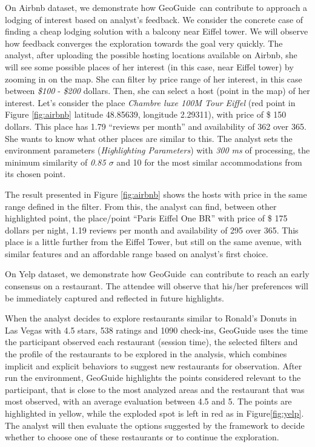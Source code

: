 \documentclass[conference,compsoc]{IEEEtran}
\newcommand{\framework}{{\sc GeoGuide}}
\begin{document}
\vspace{5pt}
 On Airbnb dataset, we demonstrate how \framework\ can contribute to approach a lodging of interest based on analyst's feedback. We consider the concrete case of finding a cheap lodging solution with a balcony near Eiffel tower. We will observe how feedback converges the exploration towards the goal very quickly. The analyst, after uploading the possible hosting locations available on Airbnb, she will see some possible places of her interest (in this case, near Eiffel tower) by zooming in on the map. She can filter by price range of her interest, in this case between \textit{\$100} - \textit{\$200} dollars. Then, she can select a host (point in the map) of her interest. Let's consider the place \textit{Chambre luxe 100M Tour Eiffel} (red point in Figure \ref{fig:airbnb} latitude 48.85639, longitude 2.29311), with price of \$ 150 dollars. This place has 1.79 ``reviews per month'' and availability of 362 over 365. She wants to know what other places are similar to this. The analyst sets the environment parameters (\textit{Highlighting Parameters}) with \textit{300 ms} of processing, the minimum similarity of \textit{0.85 $\sigma$} and 10 for the most similar accommodations from its chosen point.

The result presented in Figure \ref{fig:airbnb} shows the hosts with price in the same range defined in the filter. From this, the analyst can find, between other highlighted point, the place/point ``Paris Eiffel One BR''  with price of \$ 175 dollars per night, 1.19 reviews per month and availability of 295 over 365. This place is a little further from the Eiffel Tower, but still on the same avenue, with similar features and an affordable range based on analyst's first choice.



\vspace{5pt}
 On Yelp dataset, we demonstrate how \framework\ can contribute to reach an early consensus on a restaurant. The attendee will observe that his/her preferences will be immediately captured and reflected in future highlights. 

When the analyst decides to explore restaurants similar to Ronald's Donuts in Las Vegas with 4.5 stars, 538 ratings and 1090 check-ins, GeoGuide uses the time the participant observed each restaurant (session time), the selected filters and the profile of the restaurants to be explored in the analysis, which combines implicit and explicit behaviors to suggest new restaurants for observation. After run the environment, GeoGuide highlights the points considered relevant to the participant, that is close to the most analyzed areas and the restaurant that was most observed, with an average evaluation between 4.5 and 5. The points are highlighted in yellow, while the exploded spot is left in red as in Figure\ref{fig:yelp}. The analyst will then evaluate the options suggested by the framework to decide whether to choose one of these restaurants or to continue the exploration.
\end{document}
